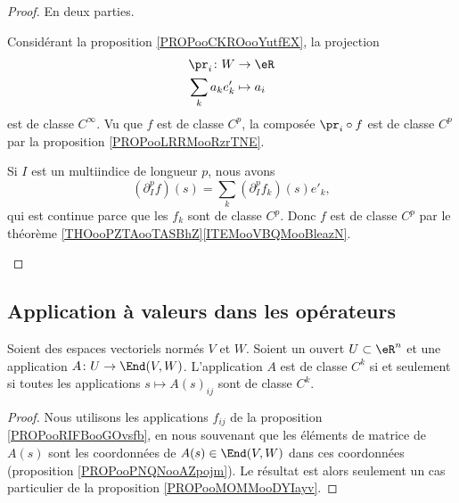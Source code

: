\begin{proof}
	En deux parties.
	\begin{subproof}
		Considérant la proposition \ref{PROPooCKROooYutfEX}, la projection
		\begin{equation}
			\begin{aligned}
				\pr_i\colon W & \to \eR     \\
				\sum_ka_ke'_k & \mapsto a_i
			\end{aligned}
		\end{equation}
		est de classe \( C^{\infty}\). Vu que \( f\) est de classe \( C^p\), la composée \( \pr_i\circ f\) est de classe \( C^p\) par la proposition \ref{PROPooLRRMooRzrTNE}.

		Si \( I\) est un multiindice de longueur \( p\), nous avons
		\begin{equation}
			(\partial^p_If)(s)=\sum_k(\partial^p_If_k)(s)e'_k,
		\end{equation}
		qui est continue parce que les \( f_k\) sont de classe \( C^p\). Donc \( f\) est de classe \( C^p\) par le théorème \ref{THOooPZTAooTASBhZ}\ref{ITEMooVBQMooBleazN}.
	\end{subproof}
\end{proof}

\subsection{Application à valeurs dans les opérateurs}

\begin{proposition}		\label{PROPooUCRNooaqsebj}
	Soient des espaces vectoriels normés \( V\) et \( W\). Soient un ouvert \( U\subset \eR^n\) et une application \(A \colon U\to \End(V,W)  \). L'application \( A\) est de classe \( C^k\) si et seulement si toutes les applications \( s\mapsto A(s)_{ij}\) sont de classe \( C^k\).
\end{proposition}

\begin{proof}
	Nous utilisons les applications \( f_{ij}\) de la proposition \ref{PROPooRIFBooGOvsfb}, en nous souvenant que les éléments de matrice de \( A(s)\) sont les coordonnées de \( A(s)\in\End(V,W)\) dans ces coordonnées (proposition \ref{PROPooPNQNooAZpojm}). Le résultat est alors seulement un cas particulier de la proposition \ref{PROPooMOMMooDYIayv}.
\end{proof}

